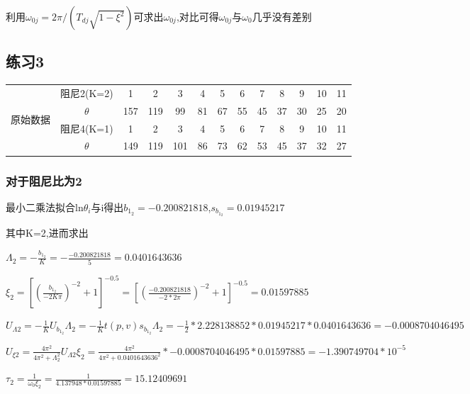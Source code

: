 \documentclass[UTF8]{ctexart}
\begin{document}
        利用$\omega_{0j}=2\pi/(T_{dj}\sqrt{1-\xi^{2}})$可求出$\omega_{0j}$,对比可得$\omega_{0j}$与$\omega_{0}$几乎没有差别
        \subsection{练习3}
        \begin{table}[!htbp]
            \centering
            \begin{tabular}{|c|c|c|c|c|c|c|c|c|c|c|c|c|}
            \hline
            \multirow{4}{*}{原始数据} & 阻尼2(K=2) & 1   & 2   & 3   & 4  & 5  & 6  & 7  & 8  & 9  & 10 & 11 \\ \cline{2-13}
                                  & $\theta$ & 157 & 119 & 99  & 81 & 67 & 55 & 45 & 37 & 30 & 25 & 20 \\ \cline{2-13}
                                  & 阻尼4(K=1) & 1   & 2   & 3   & 4  & 5  & 6  & 7  & 8  & 9  & 10 & 11 \\ \cline{2-13}
                                  & $\theta$ & 149 & 119 & 101 & 86 & 73 & 62 & 53 & 45 & 37 & 32 & 27 \\ \hline
            \end{tabular}
        \end{table}
        \subsubsection{对于阻尼比为2}

        最小二乘法拟合ln$\theta_{i}$与i得出$b_{1_{2}}=-0.200821818$,\quad $s_{b_{1_{2}}}=0.01945217$

        其中K=2,进而求出

        $\Lambda_{2}=-\frac{b_{1_{2}}}{K}=-\frac{-0.200821818}{5}=0.0401643636$

        $\xi_{2}=[(\frac{b_{1_{2}}}{-2K\pi})^{-2}+1]^{-0.5}=[(\frac{-0.200821818}{-2*2\pi})^{-2}+1]^{-0.5}=0.01597885$

        $U_{\Lambda 2}=-\frac{1}{K}U_{b_{1_{2}}}\Lambda_{2}=-\frac{1}{K}t(p,v)s_{b_{1_{2}}}\Lambda_{2}=-\frac{1}{2}*2.228138852*0.01945217*0.0401643636=-0.0008704046495$

        $U_{\xi 2}=\frac{4\pi^{2}}{4\pi^{2}+\Lambda_{2}^2}U_{\Lambda 2}\xi_{2}=\frac{4\pi^{2}}{4\pi^{2}+0.0401643636^{2}}*-0.0008704046495*0.01597885=-1.390749704*10^{-5}$

        $\tau_{2}=\frac{1}{\omega_{0}\xi_{2}}=\frac{1}{4.137948*0.01597885}=15.12409691$
\end{document}
